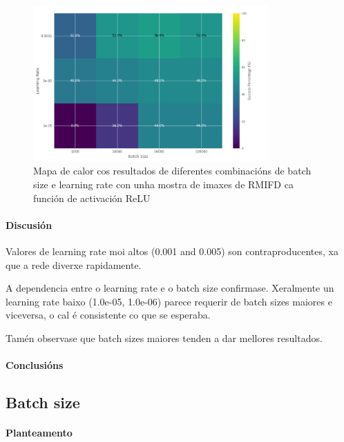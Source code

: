 \begin{figure}[ht]
    \centering
    \includegraphics[width=0.8\textwidth]{imaxes/e_heatmap_MLP_RFMID.png}
    \caption{Mapa de calor cos resultados de diferentes combinacións de batch size e learning rate con unha mostra de imaxes de RMIFD ca función de activación ReLU}
    \label{fig:e_heatmap_MLP_RFMID}
\end{figure}

\paragraph{Discusión}
\label{par:Discusión}

Valores de learning rate moi altos (0.001 and 0.005) son contraproducentes, xa que a rede diverxe rapidamente.

A dependencia entre o learning rate e o batch size confirmase. Xeralmente un learning rate baixo (1.0e-05, 1.0e-06) parece requerir de batch sizes maiores e viceversa, o cal é consistente co que se esperaba.

Tamén observase que batch sizes maiores tenden a dar mellores resultados.

\paragraph{Conclusións}
\label{par:Conclusións}

\subsection{Batch size}
\label{subsec:Batch size}

\paragraph{Planteamento}
\label{par:Planteamento}

